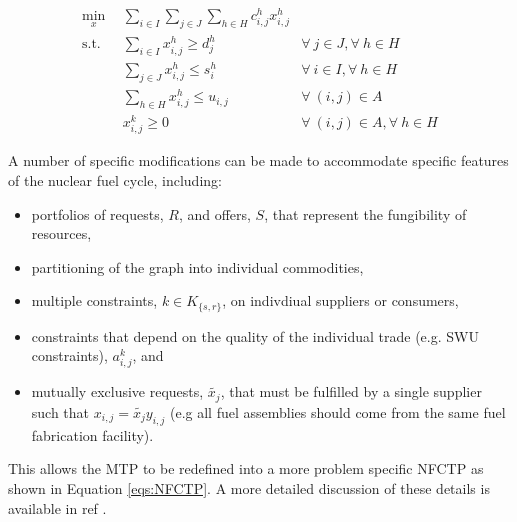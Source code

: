 \begin{subequations}\label{eqs:MCTP}
  \begin{align}
    \min_{x} \:\: & 
    \sum_{i \in I}\sum_{j \in J}\sum_{h \in H} c_{i,j}^{h} x_{i,j}^{h}
    & \label{eqs:MCTP_obj} \\
    \text{s.t.} \:\: 
    &
    \sum_{i \in I} x_{i,j}^{h} \geq d_{j}^{h}
    & 
    \forall \: j \in J, \forall \: h \in H \label{eqs:MCTP_dem} \\
    &
    \sum_{j \in J} x_{i,j}^{h} \leq s_{i}^{h}
    &
    \forall \: i \in I, \forall \: h \in H \label{eqs:MCTP_sup} \\
    &
    \sum_{h \in H} x_{i,j}^{h} \leq u_{i,j}
    & 
    \forall \: (i, j) \in A \label{eqs:MCTP_cap} \\
    &
    x_{i,j}^{k} \geq 0
    &
    \forall \: (i, j) \in A, \forall \: h \in H \label{eqs:MCTP_x}
  \end{align}
\end{subequations}


A number of specific modifications can be made to accommodate specific
features of the nuclear fuel cycle, including:
\begin{itemize}
\item portfolios of requests, $R$, and offers, $S$, that represent the
  fungibility of resources,
\item partitioning of the graph into individual commodities,
\item multiple constraints, $k \in K_{\{s,r\}}$, on indivdiual suppliers or consumers,
\item constraints that depend on the quality of the individual trade (e.g. SWU
  constraints), $a_{i,j}^k$, and
\item mutually exclusive requests, $\tilde{x_j}$, that must be fulfilled by a
  single supplier such that $x_{i,j} = \tilde{x_j} y_{i,j}$ (e.g all fuel
  assemblies should come from the same fuel fabrication facility).
\end{itemize}
This allows the \gls{MTP} to be redefined into a more problem specific
\gls{NFCTP} as shown in Equation \ref{eqs:NFCTP}.  A more detailed discussion
of these details is available in ref .

